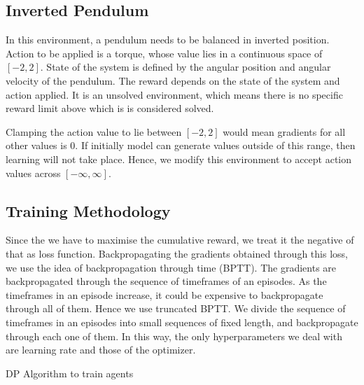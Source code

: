 \documentclass{juliacon}
\begin{document}
\subsection{Inverted Pendulum}
\label{sec:pendulum}
In this environment, a pendulum needs to be balanced in inverted position. Action to be applied is a torque, whose value lies in a continuous space of $[-2, 2]$. State of the system is defined by the angular position and angular velocity of the pendulum. The reward depends on the state of the system and action applied. It is an unsolved environment, which means there is no specific reward limit above which is is considered solved.\cite{1606.01540}

Clamping the action value to lie between $[-2, 2]$ would mean gradients for all other values is 0. If initially model can generate values outside of this range, then learning will not take place. Hence, we modify this environment to accept action values across $[-\infty, \infty]$.
\subsection{Training Methodology}
\label{sec:training}
Since the we have to maximise the cumulative reward, we treat it the negative of that as loss function. Backpropagating the gradients obtained through this loss, we use the idea of backpropagation through time (BPTT). The gradients are backpropagated through the sequence of timeframes of an episodes. As the timeframes in an episode increase, it could be expensive to backpropagate through all of them. Hence we use truncated BPTT. We divide the sequence of timeframes in an episodes into small sequences of fixed length, and backpropagate through each one of them. In this way, the only hyperparameters we deal with are learning rate and those of the optimizer.

\begin{algorithm}[!htb]
    \caption{DP Algorithm to train agents}
    \label{alg:DiffRL}
    \SetAlgoLined
    \
\end{algorithm}
\end{document}
